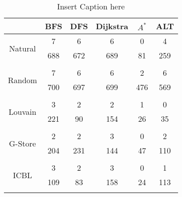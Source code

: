 \begin{table}
	\begin{center}
		 \begin{tabular}[c]{c c c c c c} \toprule
			  & BFS & DFS & Dijkstra & $A^*$  & ALT \\ \midrule 
 			\multirow{2}{*}{Natural}  & 7 & 6 & 6 & 0 & 4 \\ 
 				 & 688 & 672 & 689 & 81 & 259 \\ 
 				&&&&& \\[-0.5em]
 			\multirow{2}{*}{Random}  & 7 & 6 & 6 & 2 & 6 \\ 
 				 & 700 & 697 & 699 & 476 & 569 \\ 
 				&&&&& \\[-0.5em]
 			\multirow{2}{*}{Louvain}  & 3 & 2 & 2 & 1 & 0 \\ 
 				 & 221 & 90 & 154 & 26 & 35 \\ 
 				&&&&& \\[-0.5em]
 			\multirow{2}{*}{G-Store}  & 2 & 2 & 3 & 0 & 2 \\ 
 				 & 204 & 231 & 144 & 47 & 110 \\ 
 				&&&&& \\[-0.5em]
 			\multirow{2}{*}{ICBL}  & 3 & 2 & 3 & 0 & 1 \\ 
 				 & 109 & 83 & 158 & 24 & 113 \\ 
 				&&&&& \\[-0.5em]
 					\end{tabular}  
  	 \end{center}
	 \caption{ Insert Caption here}
\end{table}